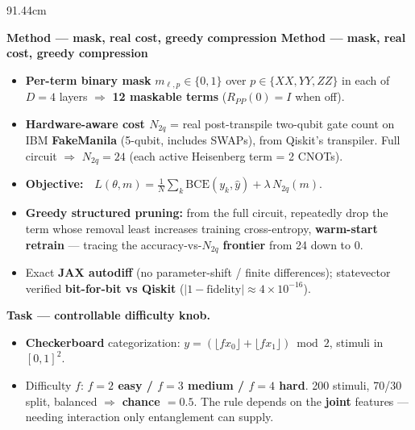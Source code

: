 \documentclass[final]{beamer}
\newlength{\colw}
\newlength{\sepw}
\newcommand{\secbar}[2]{%
  \vspace{0.15ex}%
  \begin{tcolorbox}[
      enhanced, sharp corners, boxrule=0pt, frame hidden,
      colback=dukenavy, left=10pt, right=10pt, top=7pt, bottom=7pt,
      width=\linewidth, before skip=4pt, after skip=8pt]
    \color{white}\bfseries\large
    \if\relax\detokenize{#1}\relax
      #2%
    \else
      \makebox[1.55cm][l]{[#1]}\hspace{0.2cm}#2%
    \fi
  \end{tcolorbox}%
}
\newcommand{\tl}{\textbf}  %
\begin{document}
\begin{frame}[t]{}
\begin{textblock*}{91.44cm}
\begin{minipage}[t]{\colw}
\secbar{3}{Method — mask, real cost, greedy compression}
\begin{cbox}
\begin{itemize}
  \item \tl{Per-term binary mask} $m_{\ell,p}\in\{0,1\}$ over $p\in\{XX,YY,ZZ\}$ in each
        of $D{=}4$ layers $\Rightarrow$ \tl{12 maskable terms} ($R_{PP}(0)=I$ when off).
  \item \tl{Hardware-aware cost $N_{2q}$} = real post-transpile two-qubit gate count on
        IBM \tl{FakeManila} (5-qubit, includes SWAPs), from Qiskit's transpiler. Full
        circuit $\Rightarrow$ \tl{$N_{2q}=24$} (each active Heisenberg term = 2 CNOTs).
  \item \tl{Objective:}\ \ $\displaystyle L(\theta,m)=\tfrac{1}{N}\sum_k
        \mathrm{BCE}(y_k,\hat{y})+\lambda\,N_{2q}(m).$
  \item \tl{Greedy structured pruning:} from the full circuit, repeatedly drop the term
        whose removal least increases training cross-entropy, \tl{warm-start retrain} —
        tracing the accuracy-vs-$N_{2q}$ \tl{frontier} from 24 down to 0.
  \item Exact \tl{JAX autodiff} (no parameter-shift / finite differences); statevector
        verified \tl{bit-for-bit vs Qiskit} ($|1-\mathrm{fidelity}|\approx4\times10^{-16}$).
\end{itemize}
\vspace{4pt}
\textbf{\color{dukenavy}Task — controllable difficulty knob.}
\begin{itemize}
  \item \tl{Checkerboard} categorization:
        $y=(\lfloor f x_0\rfloor+\lfloor f x_1\rfloor)\bmod 2$, stimuli in $[0,1]^2$.
  \item Difficulty $f$: \tl{$f{=}2$ easy / $f{=}3$ medium / $f{=}4$ hard}. 200 stimuli,
        70/30 split, balanced $\Rightarrow$ \tl{chance $=0.5$}. The rule depends on the
        \tl{joint} features — needing interaction only entanglement can supply.
\end{itemize}
\end{cbox}

\end{minipage}%
\hspace{\sepw}%
\begin{minipage}[t]{\colw}


\end{minipage}
\end{textblock*}
\end{frame}
\end{document}
